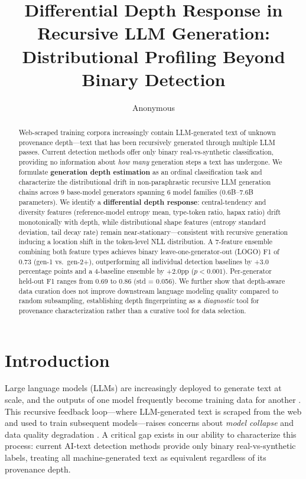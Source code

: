 \documentclass[11pt,a4paper]{article}
\title{Differential Depth Response in Recursive LLM Generation:\\Distributional Profiling Beyond Binary Detection}
\author{Anonymous}
\begin{document}
\maketitle

\begin{abstract}
Web-scraped training corpora increasingly contain LLM-generated text of unknown provenance depth---text that has been recursively generated through multiple LLM passes. Current detection methods offer only binary real-vs-synthetic classification, providing no information about \emph{how many} generation steps a text has undergone. We formulate \textbf{generation depth estimation} as an ordinal classification task and characterize the distributional drift in non-paraphrastic recursive LLM generation chains across 9 base-model generators spanning 6 model families (0.6B--7.6B parameters). We identify a \textbf{differential depth response}: central-tendency and diversity features (reference-model entropy mean, type-token ratio, hapax ratio) drift monotonically with depth, while distributional shape features (entropy standard deviation, tail decay rate) remain near-stationary---consistent with recursive generation inducing a location shift in the token-level NLL distribution. A 7-feature ensemble combining both feature types achieves binary leave-one-generator-out (LOGO) F1 of 0.73 (gen-1 vs.\ gen-2+), outperforming all individual detection baselines by +3.0 percentage points and a 4-baseline ensemble by +2.0pp ($p < 0.001$). Per-generator held-out F1 ranges from 0.69 to 0.86 (std = 0.056). We further show that depth-aware data curation does not improve downstream language modeling quality compared to random subsampling, establishing depth fingerprinting as a \emph{diagnostic} tool for provenance characterization rather than a curative tool for data selection.
\end{abstract}

\section{Introduction}

Large language models (LLMs) are increasingly deployed to generate text at scale, and the outputs of one model frequently become training data for another \cite{shumailov2024model}. This recursive feedback loop---where LLM-generated text is scraped from the web and used to train subsequent models---raises concerns about \emph{model collapse} \cite{alemohammad2023selfconsuming,dohmatob2024model} and data quality degradation \cite{gerstgrasser2024model}. A critical gap exists in our ability to characterize this process: current AI-text detection methods \cite{mitchell2023detectgpt,bao2024fastdetectgpt,hans2024binoculars} provide only binary real-vs-synthetic labels, treating all machine-generated text as equivalent regardless of its provenance depth.
\end{document}
